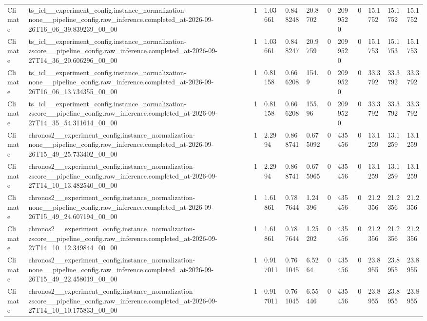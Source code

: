 \begin{tabular}{llllllllllll}
Climate & ts\_icl\_\_experiment\_config.instance\_normalization-none\_\_pipeline\_config.raw\_inference.completed\_at-2026-09-26T16\_06\_39.839239\_00\_00 & 1 & 1.03661 & 0.848248 & 20.8702 & 0 & 2099520 & 0 & 15.1752 & 15.1752 & 15.1752 \\
Climate & ts\_icl\_\_experiment\_config.instance\_normalization-zscore\_\_pipeline\_config.raw\_inference.completed\_at-2026-09-27T14\_36\_20.606296\_00\_00 & 1 & 1.03661 & 0.848247 & 20.9759 & 0 & 2099520 & 0 & 15.1753 & 15.1753 & 15.1753 \\
Climate & ts\_icl\_\_experiment\_config.instance\_normalization-none\_\_pipeline\_config.raw\_inference.completed\_at-2026-09-26T16\_06\_13.734355\_00\_00 & 1 & 0.81158 & 0.666208 & 154.9 & 0 & 2099520 & 0 & 33.3792 & 33.3792 & 33.3792 \\
Climate & ts\_icl\_\_experiment\_config.instance\_normalization-zscore\_\_pipeline\_config.raw\_inference.completed\_at-2026-09-27T14\_35\_54.311614\_00\_00 & 1 & 0.81158 & 0.666208 & 155.96 & 0 & 2099520 & 0 & 33.3792 & 33.3792 & 33.3792 \\
Climate & chronos2\_\_experiment\_config.instance\_normalization-none\_\_pipeline\_config.raw\_inference.completed\_at-2026-09-26T15\_49\_25.733402\_00\_00 & 1 & 2.2994 & 0.868741 & 0.675092 & 0 & 435456 & 0 & 13.1259 & 13.1259 & 13.1259 \\
Climate & chronos2\_\_experiment\_config.instance\_normalization-zscore\_\_pipeline\_config.raw\_inference.completed\_at-2026-09-27T14\_10\_13.482540\_00\_00 & 1 & 2.2994 & 0.868741 & 0.675965 & 0 & 435456 & 0 & 13.1259 & 13.1259 & 13.1259 \\
Climate & chronos2\_\_experiment\_config.instance\_normalization-none\_\_pipeline\_config.raw\_inference.completed\_at-2026-09-26T15\_49\_24.607194\_00\_00 & 1 & 1.61861 & 0.787644 & 1.24396 & 0 & 435456 & 0 & 21.2356 & 21.2356 & 21.2356 \\
Climate & chronos2\_\_experiment\_config.instance\_normalization-zscore\_\_pipeline\_config.raw\_inference.completed\_at-2026-09-27T14\_10\_12.349844\_00\_00 & 1 & 1.61861 & 0.787644 & 1.25202 & 0 & 435456 & 0 & 21.2356 & 21.2356 & 21.2356 \\
Climate & chronos2\_\_experiment\_config.instance\_normalization-none\_\_pipeline\_config.raw\_inference.completed\_at-2026-09-26T15\_49\_22.458019\_00\_00 & 1 & 0.917011 & 0.761045 & 6.5264 & 0 & 435456 & 0 & 23.8955 & 23.8955 & 23.8955 \\
Climate & chronos2\_\_experiment\_config.instance\_normalization-zscore\_\_pipeline\_config.raw\_inference.completed\_at-2026-09-27T14\_10\_10.175833\_00\_00 & 1 & 0.917011 & 0.761045 & 6.55446 & 0 & 435456 & 0 & 23.8955 & 23.8955 & 23.8955 \\

\end{tabular}
